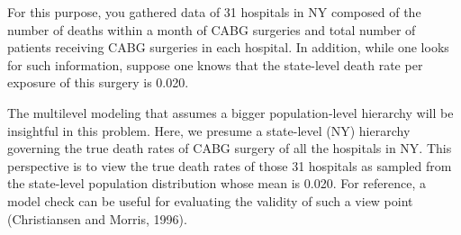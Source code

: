 \documentclass[article]{jss}
\begin{document}
For this purpose, you gathered data of 31 hospitals in NY composed of the number of deaths within a month of CABG surgeries and total number of patients receiving CABG surgeries in each hospital. In addition, while one looks for such information, suppose one knows that the state-level death rate per exposure of this surgery is 0.020. 


The multilevel modeling that assumes a bigger population-level hierarchy will be insightful in this problem. Here, we presume a state-level (NY) hierarchy governing the true death rates of CABG surgery of all the hospitals in NY. This perspective is to view the true death rates of those 31 hospitals as sampled from the state-level population distribution whose mean is 0.020. For reference, a model check can be useful for evaluating the validity of such a view point (Christiansen and Morris, 1996). 
\end{document}
